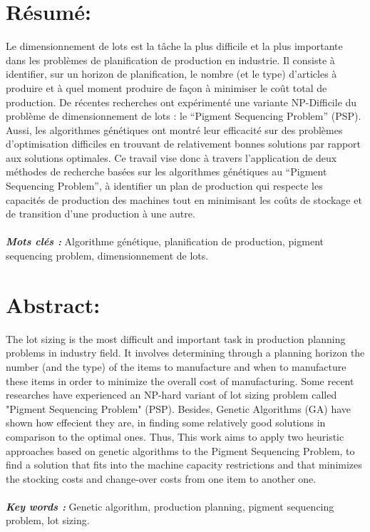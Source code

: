 \documentclass[12pt,a4paper]{article}
\begin{document}
	\newpage %
	
	\section*{Résumé:}
	
	\vspace{1cm}
	
	Le dimensionnement de lots est la tâche la plus difficile et la plus importante dans les problèmes de planification de production en industrie. Il consiste à identifier, sur un horizon de planification, le nombre (et le type) d’articles à produire et à quel moment produire de façon à minimiser le coût total de production. De récentes recherches ont expérimenté une variante NP-Difficile du problème de dimensionnement de lots : le “Pigment Sequencing Problem” (PSP). Aussi, les algorithmes génétiques ont montré leur efficacité sur des problèmes d’optimisation difficiles en trouvant de relativement bonnes solutions par rapport aux solutions optimales. Ce travail vise donc à travers l'application de deux méthodes de recherche basées sur les algorithmes génétiques au “Pigment Sequencing Problem”, à identifier un plan de production qui respecte les capacités de production des machines tout en minimisant les coûts de stockage et de transition d’une production à une autre. \\
	\\
	\hspace*{.5cm}\textsl{\textbf{Mots clés :}} Algorithme génétique, planification de production, pigment sequencing problem, dimensionnement de lots.
	
	\newpage %
	
	\section*{Abstract:}
	
	\vspace{1cm}
	
	The lot sizing is the most difficult and important task in production planning problems in industry field. It involves determining through a planning horizon the number (and the type) of the items to manufacture and when to manufacture these items in order to minimize the overall cost of manufacturing. Some recent researches have experienced an NP-hard variant of lot sizing problem called "Pigment Sequencing Problem" (PSP). Besides, Genetic Algorithms (GA) have shown how effecient they are, in finding some relatively good solutions in comparison to the optimal ones. Thus, This work aims to apply two heuristic approaches based on genetic algorithms to the Pigment Sequencing Problem, to find a solution that fits into the machine capacity restrictions and that minimizes the stocking costs and change-over costs from one item to another one.\\
	\\
	\hspace*{.5cm}\textsl{\textbf{Key words :}} Genetic algorithm, production planning, pigment sequencing problem, lot sizing.
	
\end{document}
